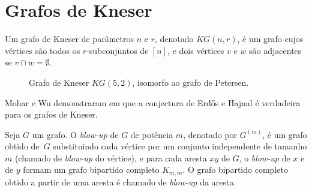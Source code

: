 \chapter{Grafos de Kneser}
\label{cap:kneser}


\begin{definicao}
Um grafo de Kneser de parâmetros $n$ e $r$, denotado $KG(n,r)$, é um grafo cujos vértices são todos os $r$-subconjuntos de $[n]$, e dois vértices $v$ e $w$ são adjacentes se $v \cap w = \emptyset$.
\end{definicao}

\begin{figure}[H]
\centering
{}
\caption{Grafo de Kneser $KG(5,2)$, isomorfo ao grafo de Petersen.}
\label{fig:kneserpetersen}
\end{figure}

Mohar e Wu demonstraram em \cite{mohar2015triangle} que a conjectura de Erd\H{o}s e Hajnal é verdadeira para os grafos de Kneser.

\begin{definicao}
Seja $G$ um grafo. O \textit{blow-up} de $G$ de potência $m$, denotado por $G^{(m)}$, é um grafo obtido de~$G$ substituindo cada vértice por um conjunto independente de tamanho $m$ (chamado de \textit{blow-up} do vértice), e para cada aresta $xy$ de $G$, o \textit{blow-up} de $x$ e de $y$ formam um grafo bipartido completo $K_{m,m}$. O grafo bipartido completo obtido a partir de uma aresta é chamado de \textit{blow-up} da aresta.
\end{definicao}

